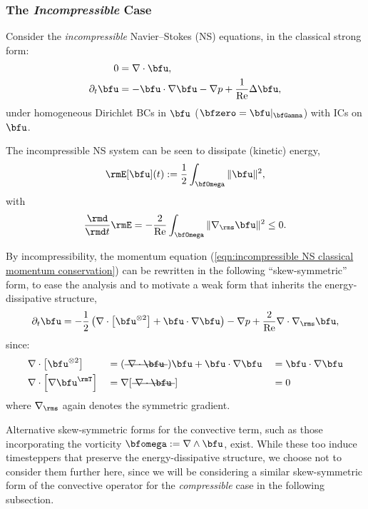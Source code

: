 \subsubsection*{The \emph{Incompressible} Case}
    Consider the \emph{incompressible} Navier--Stokes (NS) equations, in the classical strong form:
    \begin{align}
                       0  &=  \nabla\cdot\bfu,  \label{eqn:incompressible NS mass conservation}  \\
        \partial_{t}\bfu  &=  - \bfu\cdot\nabla\bfu - \nabla p + \frac{1}{\rmRe}\Delta\bfu,  \label{eqn:incompressible NS classical momentum conservation}
    \end{align}
    under homogeneous Dirichlet BCs in $\bfu$ ($\bfzero  =  \bfu|_{\bfGamma}$) with ICs on $\bfu$.
    
    The incompressible NS system can be seen to dissipate (kinetic) energy,
    \begin{equation}\label{eqn:incompressible NS energy definition}
        \rmE[\bfu](t)  :=  \frac{1}{2}\int_{\bfOmega}\|\bfu\|^{2},
    \end{equation}
    with
    \begin{equation}
        \frac{\rmd}{\rmd t}\rmE  =  - \frac{2}{\rmRe}\int_{\bfOmega}\|\nabla_{\rms}\bfu\|^{2}  \leq  0.
    \end{equation}

    By incompressibility, the momentum equation (\ref{eqn:incompressible NS classical momentum conservation}) can be rewritten in the following ``skew-symmetric'' form, to ease the analysis and to motivate a weak form that inherits the energy-dissipative structure,
    \begin{equation}\label{eqn:incompressible NS skew-symmetric momentum equation}
        \partial_{t}\bfu  =  - \frac{1}{2}\left(\nabla\cdot\left[\bfu^{\otimes 2}\right] + \bfu\cdot\nabla\bfu\right) - \nabla p + \frac{2}{\rmRe}\nabla\cdot\nabla_{\rms}\bfu,
    \end{equation}
    since:
    \begin{align}
        &\nabla\cdot\left[\bfu^{\otimes 2}\right]   &&=  (\mst{\nabla\cdot\bfu})\bfu + \bfu\cdot\nabla\bfu  &&=  \bfu\cdot\nabla\bfu  \\
        &\nabla\cdot\left[\nabla\bfu^{\rmT}\right]  &&=  \nabla[\mst{\nabla\cdot\bfu}]                      &&=  0
    \end{align}
    where $\nabla_{\rms}$ again denotes the symmetric gradient.

    \begin{remark}
        Alternative skew-symmetric forms for the convective term, such as those incorporating the vorticity $\bfomega  :=  \nabla\wedge\bfu$, exist. While these too induce timesteppers that preserve the energy-dissipative structure, we choose not to consider them further here, since we will be considering a similar skew-symmetric form of the convective operator for the \emph{compressible} case in the following subsection.
    \end{remark}

